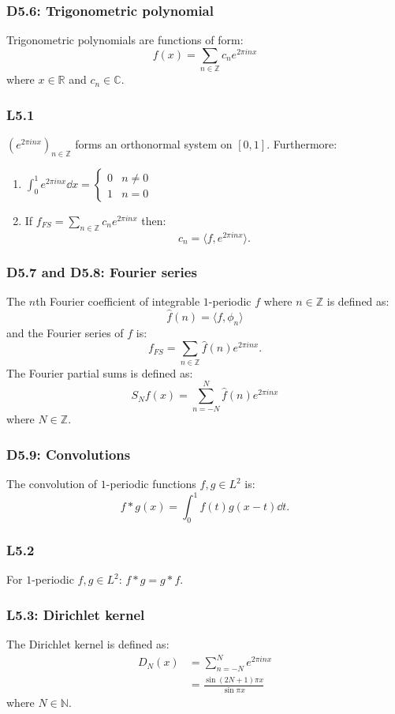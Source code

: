 \documentclass{article}
\begin{document}
\begin{multicols*}{3}
\subsubsection*{D5.6: Trigonometric polynomial}
Trigonometric polynomials are functions of form:
$$f(x)=\sum_{n\in\mathbb{Z}}
c_n e^{2\pi inx}$$
where $x\in\mathbb{R}$ and $c_n\in\mathbb{C}$.

\subsubsection*{L5.1}
$(e^{2\pi inx})_{n\in\mathbb{Z}}$ forms
an orthonormal system on $[0,1]$. Furthermore:
\begin{enumerate}
    \item $\displaystyle
    \int_{0}^{1}e^{2\pi inx}\dd x
    =\left\{\begin{array}{ll}
        0 & n\neq0 \\
        1 & n=0
    \end{array}\right.$

    \item If
    $\displaystyle f_{FS}
    =\sum_{n\in\mathbb{Z}}c_n e^{2\pi inx}$ then:
    $$c_n=\langle f,e^{2\pi inx}\rangle.$$
\end{enumerate}

\subsubsection*{D5.7 and D5.8: Fourier series}
The $n$th Fourier coefficient of integrable $1$-periodic $f$
where $n\in\mathbb{Z}$ is defined as:
$$\widehat{f}(n)=\langle f,\phi_n\rangle$$
and the Fourier series of $f$ is:
$$f_{FS}=\sum_{n\in\mathbb{Z}}\widehat{f}(n)
e^{2\pi inx}.$$
The Fourier partial sums is defined as:
$$S_N f(x)=\sum_{n=-N}^{N}
\widehat{f}(n)e^{2\pi inx}$$
where $N\in\mathbb{Z}$.

\subsubsection*{D5.9: Convolutions}
The convolution of $1$-periodic
functions $f,g\in L^2$ is:
$$f*g(x)=\int_{0}^{1}f(t)g(x-t)\dd t.$$

\subsubsection*{L5.2}
For $1$-periodic $f,g\in L^2$:
$f*g=g*f$.

\subsubsection*{L5.3: Dirichlet kernel}
The Dirichlet kernel is defined as:
\begin{align*}
    D_N(x)
    &=\sum_{n=-N}^{N}e^{2\pi inx} \\
    &=\frac{\sin(2N+1)\pi x}{\sin\pi x}
\end{align*}
where $N\in\mathbb{N}$.


\end{multicols*}
\end{document}
